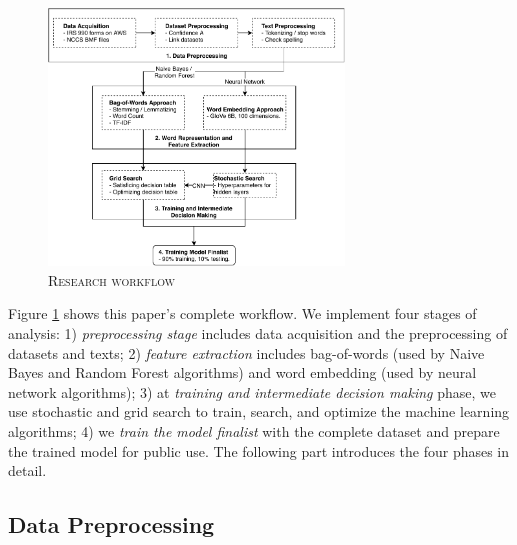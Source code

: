 \documentclass[11pt]{article}
\begin{document}
\begin{figure}
	\centering
	\caption{\textsc{Research workflow}} \label{fig:workflow}
	\includegraphics[width=0.7\textwidth]{tbl_fig/ntee_classification.pdf}
\end{figure}

Figure \ref{fig:workflow} shows this paper's complete workflow. We implement four stages of analysis: 1) \textit{preprocessing stage} includes data acquisition and the preprocessing of datasets and texts; 2) \textit{feature extraction} includes bag-of-words (used by Naive Bayes and Random Forest algorithms) and word embedding (used by neural network algorithms); 3) at \textit{training and intermediate decision making} phase, we use stochastic and grid search to train, search, and optimize the machine learning algorithms; 4) we \textit{train the model finalist} with the complete dataset and prepare the trained model for public use. The following part introduces the four phases in detail.

\subsection{Data Preprocessing}

\end{document}
